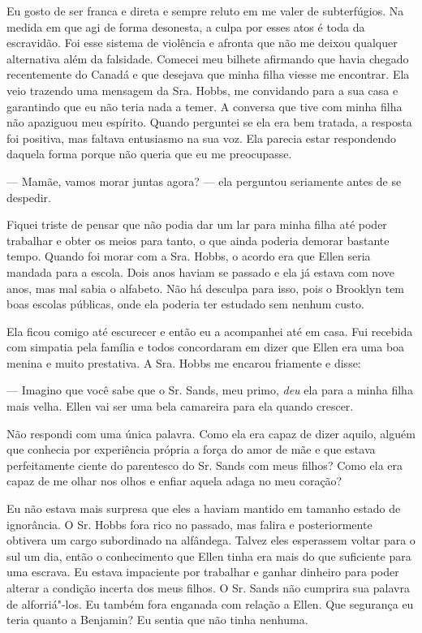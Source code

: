 Eu gosto de ser franca e direta e
sempre reluto em me valer de subterfúgios. Na medida em que agi de forma
desonesta, a culpa por esses atos é toda da escravidão. Foi esse sistema
de violência e afronta que não me deixou qualquer alternativa além da
falsidade. Comecei meu bilhete afirmando que havia chegado recentemente
do Canadá e que desejava que minha filha viesse me encontrar. Ela veio
trazendo uma mensagem da Sra. Hobbs, me convidando para a sua casa e
garantindo que eu não teria nada a temer. A conversa que tive com minha
filha não apaziguou meu espírito. Quando perguntei se ela era bem
tratada, a resposta foi positiva, mas faltava entusiasmo na sua voz. Ela
parecia estar respondendo daquela forma porque não queria que eu me
preocupasse.

--- Mamãe, vamos morar juntas agora? --- ela perguntou seriamente antes
de se despedir.

Fiquei triste de pensar que não podia dar um lar para minha filha até
poder trabalhar e obter os meios para tanto, o que ainda poderia demorar
bastante tempo. Quando foi morar com a Sra. Hobbs, o acordo era que
Ellen seria mandada para a escola. Dois anos haviam se passado e ela já
estava com nove anos, mas mal sabia o alfabeto. Não há desculpa para
isso, pois o Brooklyn tem boas escolas públicas, onde ela poderia ter
estudado sem nenhum custo.

Ela ficou comigo até escurecer e então
eu a acompanhei até em casa. Fui recebida com simpatia pela família e
todos concordaram em dizer que Ellen era uma boa menina e muito
prestativa. A Sra. Hobbs me encarou friamente e disse:

--- Imagino que você sabe que o Sr. Sands, meu primo, \emph{deu} ela
para a minha filha mais velha. Ellen vai ser uma bela camareira para ela
quando crescer.

Não respondi com uma única palavra. Como ela era capaz de dizer aquilo,
alguém que conhecia por experiência própria a força do amor de mãe e que
estava perfeitamente ciente do parentesco do Sr. Sands com meus filhos?
Como ela era capaz de me olhar nos olhos e enfiar aquela adaga no meu
coração?

Eu não estava mais surpresa que eles a
haviam mantido em tamanho estado de ignorância. O Sr. Hobbs fora rico no
passado, mas falira e posteriormente obtivera um cargo subordinado na
alfândega. Talvez eles esperassem voltar para o sul um dia, então o
conhecimento que Ellen tinha era mais do que suficiente para uma
escrava. Eu estava impaciente por trabalhar e ganhar dinheiro para poder
alterar a condição incerta dos meus filhos. O Sr. Sands não cumprira sua
palavra de alforriá"-los. Eu também fora enganada com relação a Ellen.
Que segurança eu teria quanto a Benjamin? Eu sentia que não tinha
nenhuma.

